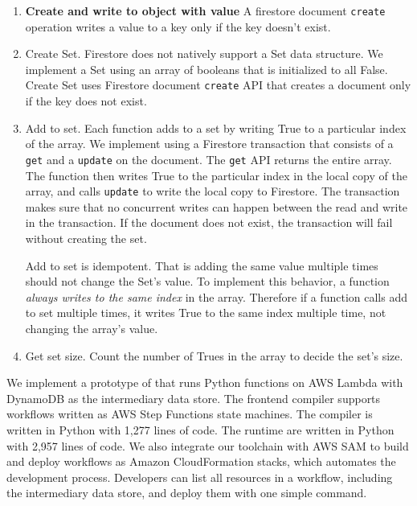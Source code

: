 \begin{enumerate}
  \item \textbf{Create and write to object with value} A firestore document \texttt{create} operation writes a value to a key only if the key doesn't exist.
  \item Create Set. Firestore does not natively support a Set data structure. We implement a Set using an array of booleans that is initialized to all False. Create Set uses Firestore document \texttt{create} API that creates a document only if the key does not exist.
  \item Add to set. Each function adds to a set by writing True to a particular index of the array. We implement using a Firestore transaction that consists of a \texttt{get} and a \texttt{update} on the document. The \texttt{get} API returns the entire array. The function then writes True to the particular index in the local copy of the array, and calls \texttt{update} to write the local copy to Firestore. The transaction makes sure that no concurrent writes can happen between the read and write in the transaction. If the document does not exist, the transaction will fail without creating the set.

  Add to set is idempotent. That is adding the same value multiple times should not change the Set's value. To implement this behavior, a function \emph{always writes to the same index} in the array. Therefore if a function calls add to set multiple times, it writes True to the same index multiple time, not changing the array's value.

  \item Get set size. Count the number of Trues in the array to decide the set's size.
\end{enumerate}


We implement a prototype of \name{} that runs Python functions on AWS Lambda
with DynamoDB as the intermediary data store. The frontend compiler
supports workflows written as AWS Step Functions state machines. The compiler
is written in Python with 1,277 lines of code.
The runtime are written in Python with 2,957 lines of code. We also integrate
our toolchain with AWS SAM to build and deploy \name{} workflows as Amazon
CloudFormation stacks, which automates the development process. Developers can
list all resources in a workflow, including the intermediary data store, and
deploy them with one simple command.

